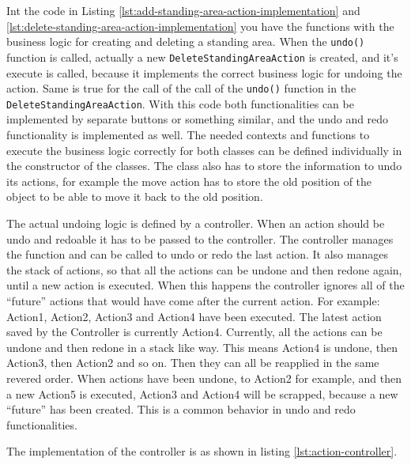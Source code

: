 Int the code in Listing \ref{lst:add-standing-area-action-implementation} and \ref{lst:delete-standing-area-action-implementation} you have the functions with the business logic for creating and deleting a standing area. When the \texttt{undo()} function is called, actually a new \texttt{DeleteStandingAreaAction} is created, and it's execute is called, because it implements the correct business logic for undoing the action. Same is true for the call of the call of the \texttt{undo()} function in the \texttt{DeleteStandingAreaAction}. With this code both functionalities can be implemented by separate buttons or something similar, and the undo and redo functionality is implemented as well. The needed contexts and functions to execute the business logic correctly for both classes can be defined individually in the constructor of the classes. The class also has to store the information to undo its actions, for example the move action has to store the old position of the object to be able to move it back to the old position.

The actual undoing logic is defined by a controller. When an action should be undo and redoable it has to be passed to the controller. The controller manages the function and can be called to undo or redo the last action. It also manages the stack of actions, so that all the actions can be undone and then redone again, until a new action is executed. When this happens the controller ignores all of the ``future'' actions that would have come after the current action. For example: Action1, Action2, Action3 and Action4 have been executed. The latest action saved by the Controller is currently Action4. Currently, all the actions can be undone and then redone in a stack like way. This means Action4 is undone, then Action3, then Action2 and so on. Then they can all be reapplied in the same revered order. When actions have been undone, to Action2 for example, and then a new Action5 is executed, Action3 and Action4 will be scrapped, because a new ``future'' has been created. This is a common behavior in undo and redo functionalities.

The implementation of the controller is as shown in listing \ref{lst:action-controller}.

